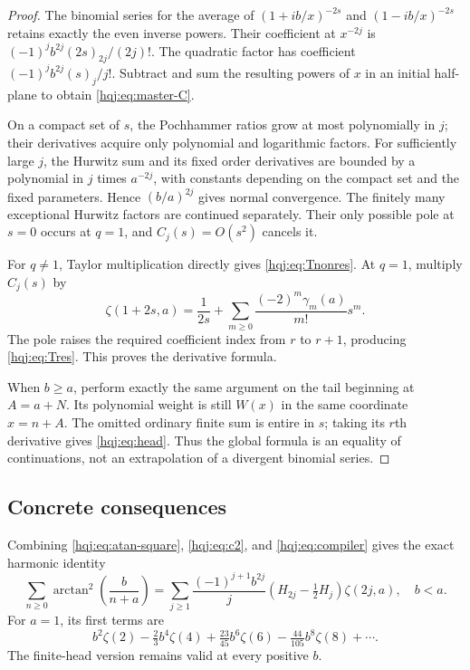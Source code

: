 \begin{proof}
The binomial series for the average of $(1+ib/x)^{-2s}$ and
$(1-ib/x)^{-2s}$ retains exactly the even inverse powers. Their
coefficient at $x^{-2j}$ is
$(-1)^jb^{2j}(2s)_{2j}/(2j)!$. The quadratic factor has coefficient
$(-1)^jb^{2j}(s)_j/j!$. Subtract and sum the resulting powers of $x$ in
an initial half-plane to obtain \eqref{hqj:eq:master-C}.

On a compact set of $s$, the Pochhammer ratios grow at most polynomially
in $j$; their derivatives acquire only polynomial and logarithmic
factors. For sufficiently large $j$, the Hurwitz sum and its fixed
order derivatives are bounded by a polynomial in $j$ times
$a^{-2j}$, with constants depending on the compact set and the fixed
parameters. Hence $(b/a)^{2j}$ gives normal convergence. The finitely
many exceptional Hurwitz factors are continued separately. Their only
possible pole at $s=0$ occurs at $q=1$, and $C_j(s)=O(s^2)$ cancels it.

For $q\ne1$, Taylor multiplication directly gives
\eqref{hqj:eq:Tnonres}. At $q=1$, multiply $C_j(s)$ by
\[
\zeta(1+2s,a)=\frac1{2s}
+\sum_{m\ge0}\frac{(-2)^m\gamma_m(a)}{m!}s^m.
\]
The pole raises the required coefficient index from $r$ to $r+1$,
producing \eqref{hqj:eq:Tres}. This proves the derivative formula.

When $b\ge a$, perform exactly the same argument on the tail beginning
at $A=a+N$. Its polynomial weight is still $W(x)$ in the same coordinate
$x=n+A$. The omitted ordinary finite sum is entire in $s$; taking its
$r$th derivative gives \eqref{hqj:eq:head}. Thus the global formula is
an equality of continuations, not an extrapolation of a divergent
binomial series.
\end{proof}

\subsection{Concrete consequences}
Combining \eqref{hqj:eq:atan-square}, \eqref{hqj:eq:c2}, and
\eqref{hqj:eq:compiler} gives the exact harmonic identity
\begin{equation}\label{hqj:eq:atan-harmonic}
\sum_{n\ge0}\arctan^2\!\left(\frac b{n+a}\right)
=\sum_{j\ge1}\frac{(-1)^{j+1}b^{2j}}j
\left(H_{2j}-\tfrac12H_j\right)\zeta(2j,a),\quad b<a.
\end{equation}
For $a=1$, its first terms are
\[
b^2\zeta(2)-\tfrac23b^4\zeta(4)+\tfrac{23}{45}b^6\zeta(6)
-\tfrac{44}{105}b^8\zeta(8)+\cdots.
\]
The finite-head version remains valid at every positive $b$.

